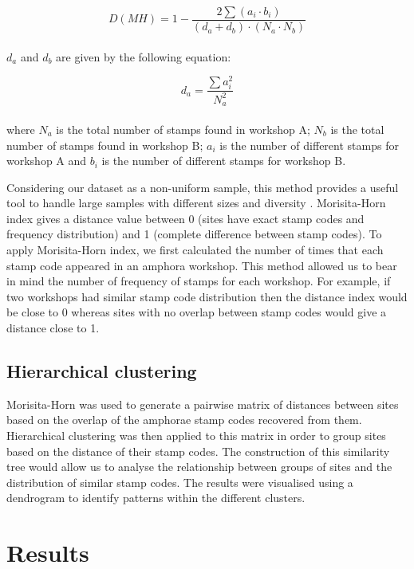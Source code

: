 \begin{equation}
D(MH) = 1- \frac{2 \sum(a_{i} \cdot b_{i})}{(d_{a} + d_{b}) \cdot (N_{a} \cdot N_{b})}
\end{equation} \\

$d_{a}$ and $d_{b}$ are given by the following equation:

\begin{equation}
d_{a} = \frac{\sum a_{i}^{2}}{N_{a}^{2}} 
\end{equation} \\

where $N_{a}$ is the total number of stamps found in workshop A; $N_{b}$ is the total number of stamps found in workshop B; $a_{i}$ is the number of different stamps for workshop A and $b_{i}$ is the number of different stamps for workshop B.

Considering our dataset as a non-uniform sample, this method provides a useful tool to handle large samples with different sizes and diversity \citep{wolda_similarity_1981}. Morisita-Horn index gives a distance value between 0 (sites have exact stamp codes and frequency distribution) and 1 (complete difference between stamp codes). To apply Morisita-Horn index, we first calculated the number of times that each stamp code appeared in an amphora workshop. 
This method allowed us to bear in mind the number of frequency of stamps for each workshop. For example, if two workshops had similar stamp code distribution then the distance index would be close to 0 whereas sites with no overlap between stamp codes would give a distance close to 1.

\subsection{Hierarchical clustering}
\label{sec:5}

Morisita-Horn was used to generate a pairwise matrix of distances between sites based on the overlap of the amphorae stamp codes recovered from them. Hierarchical clustering was then applied to this matrix in order to group sites based on the distance of their stamp codes. The construction of this similarity tree would allow us to analyse the relationship between groups of sites and the distribution of similar stamp codes. The results were visualised using a dendrogram to identify patterns within the different clusters.

\section{Results}
\label{sec:6}

